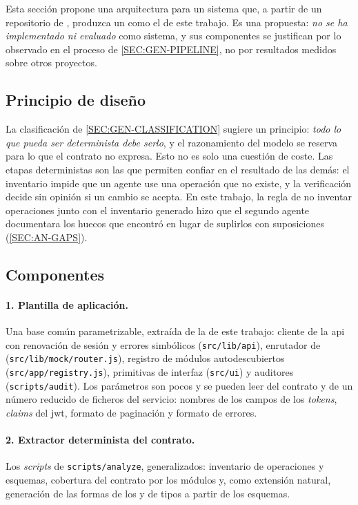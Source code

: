 Esta sección propone una arquitectura para un sistema que, a partir de un repositorio de
, produzca un  como el de este trabajo. Es una propuesta: \emph{no se
ha implementado ni evaluado} como sistema, y sus componentes se justifican por lo observado
en el proceso de \cref{SEC:GEN-PIPELINE}, no por resultados medidos sobre otros proyectos.

\subsection{Principio de diseño}

La clasificación de \cref{SEC:GEN-CLASSIFICATION} sugiere un principio: \emph{todo lo que
pueda ser determinista debe serlo}, y el razonamiento del modelo se reserva para lo que el
contrato no expresa. Esto no es solo una cuestión de coste. Las etapas deterministas son las
que permiten confiar en el resultado de las demás: el inventario impide que un agente use una
operación que no existe, y la verificación decide sin opinión si un cambio se acepta. En este
trabajo, la regla de no inventar operaciones junto con el inventario generado hizo que el
segundo agente documentara los huecos que encontró en lugar de suplirlos con suposiciones
(\cref{SEC:AN-GAPS}).

\subsection{Componentes}

\paragraph{1. Plantilla de aplicación.} Una base común parametrizable, extraída de la de este
trabajo: cliente de la \acs{api} con renovación de sesión y errores simbólicos
(\texttt{src/lib/api}), enrutador de  (\texttt{src/lib/mock/router.js}),
registro de módulos autodescubiertos (\texttt{src/app/registry.js}), primitivas de interfaz
(\texttt{src/ui}) y auditores (\texttt{scripts/audit}). Los parámetros son pocos y se pueden
leer del contrato y de un número reducido de ficheros del servicio: nombres de los campos de
los \textit{tokens}, \textit{claims} del \acs{jwt}, formato de paginación y formato de errores.

\paragraph{2. Extractor determinista del contrato.} Los \textit{scripts} de
\texttt{scripts/analyze}, generalizados: inventario de operaciones y esquemas, cobertura del
contrato por los módulos y, como extensión natural, generación de las formas de los
 y de tipos a partir de los esquemas.

